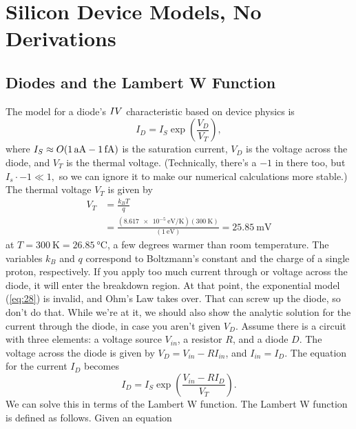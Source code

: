 \documentclass[12pt]{report}
\begin{document}
\section{Silicon Device Models, No Derivations}
\subsection{Diodes and the Lambert W Function}
The model for a diode's $I \- V$ characteristic  based on device physics is
\begin{equation}
\label{eq:28}
I_{D} = I_{S} \exp \left( \frac{V_{D}}{V_{T}} \right),
\end{equation}
where $I_{S} \approx O(\SI{1}{aA} \-- \SI{1}{fA})$ is the saturation current, $V_{D}$ is the voltage across the diode, and $V_{T}$ is the thermal voltage. (Technically, there's a $-1$ in there too, but $I_{s} \cdot  -1 \ll 1,$ so we can ignore it to make our numerical calculations more stable.) The thermal voltage $V_{T}$ is given by
\begin{equation}
  \begin{aligned}
\label{eq:29}
V_{T} &= \frac{k_{B} T}{q} \\ &= \frac{\left( \SI{8.617e-5}{\electronvolt \per \kelvin} \right) \left( \SI{300}{\kelvin} \right) }{ \left( \SI{1}{\electronvolt} \right) } = \SI{25.85}{\milli \volt}
\end{aligned}
\end{equation}
at $T = \SI{300}{\kelvin} = \SI{26.85}{\celsius}$, a few degrees warmer than room temperature. The variables $k_{B}$ and $q$ correspond to Boltzmann's constant and the charge of a single proton, respectively. If you apply too much current through or voltage across the diode, it will enter the breakdown region. At that point, the exponential model (\ref{eq:28}) is invalid, and Ohm's Law takes over. That can screw up the diode, so don't do that.
While we're at it, we should also show the analytic solution for the current through the diode, in case you aren't given $V_{D}$. Assume there is a circuit with three elements: a voltage source $V_{in}$, a resistor $R$, and a diode $D$. The voltage across the diode is given by $V_{D} = V_{in} - R I_{in}$, and $I_{in} = I_{D}$. The equation for the current $I_{D}$ becomes
\begin{equation}
\label{eq:30}
I_{D} = I_{S} \exp \left( \frac{V_{in} - R I_{D}}{V_{T}} \right).
\end{equation}
We can solve this in terms of the Lambert W function. The Lambert W function is defined as follows. Given an equation
\end{document}
